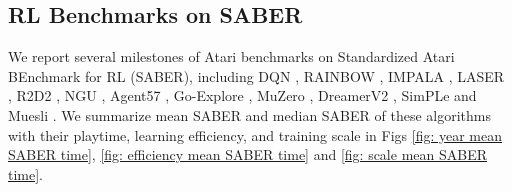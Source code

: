 \documentclass[nohyperref]{article}
\theoremstyle{plain}
\begin{document}
\begin{figure*}[!t]
    \centering
	\centering
	\caption{SOTA algorithms of Atari 57 games on mean and median HWRNS (\%) and corresponding training scale.}
	\label{fig: scale mean HWRNS time}
\end{figure*}

\subsection{RL Benchmarks on SABER}
\label{app: RL Benchmarks on SABER}

We report several milestones of Atari benchmarks on Standardized Atari BEnchmark for RL (SABER), including DQN \citep{dqn}, RAINBOW \citep{rainbow}, IMPALA \citep{impala}, LASER \citep{laser}, R2D2 \citep{r2d2}, NGU \citep{ngu}, Agent57 \citep{agent57}, Go-Explore \citep{goexplore}, MuZero \citep{muzero}, DreamerV2 \citep{dreamerv2}, SimPLe \citep{modelbasedatari} and Muesli \citep{muesli}. We summarize mean SABER and median SABER of these algorithms  with their playtime, learning efficiency, and training scale in Figs \ref{fig: year mean SABER time}, \ref{fig: efficiency mean SABER time} and \ref{fig: scale mean SABER time}.

\begin{figure*}[!t]
    \centering
	\centering
	\caption{SOTA algorithms of Atari 57 games on mean and median SABER (\%) and corresponding playtime.}
	\label{fig: year mean SABER time}
\end{figure*}

\begin{figure*}[!t]
    \centering
	\centering
	\caption{SOTA algorithms of Atari 57 games on mean and median SABER (\%) and corresponding learning efficiency calculated by $\frac{\text{MEAN SABER/MEDIAN SABER}}{\text{TRAINING FRAMES}}$.}
	\label{fig: efficiency mean SABER time}
\end{figure*}
\end{document}
